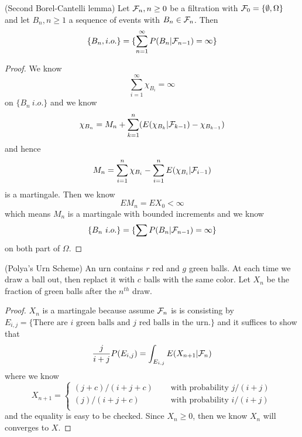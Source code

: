 \begin{theorem}
    (Second Borel-Cantelli lemma) Let $\mathcal{F}_n,n\geq 0$ be a filtration with $\mathcal{F}_0 = \{\emptyset,\Omega\}$ and let $B_n, n\geq 1$ a sequence of events with $B_n \in \mathcal{F}_n$. Then
    \[\{B_n,i.o.\} = \{\sum\limits_{n=1}^{\infty}P(B_n|\mathcal{F}_{n-1}) = \infty\}\]
\end{theorem}
\begin{proof}
    We know
    \[
    \sum\limits_{i=1}^{\infty} \chi_{B_i} = \infty
    \]
    on $\{B_n\ i.o.\}$
    and we know
    \[
    \chi_{B_n} = M_n + \sum\limits_{k=1}^n (E(\chi_{B_k}|\mathcal{F}_{k-1})-\chi_{B_{k-1}})
    \]
    and hence
    \[
    M_n = \sum\limits_{i=1}^n \chi_{B_i} - \sum\limits_{i=1}^{n}E(\chi_{B_i}|\mathcal{F}_{i-1})
    \]
    is a martingale. Then we know
    \[
    EM_n = EX_0 <\infty
    \]
    which means $M_n$ is a martingale with bounded increments and we know
    \[
    \{B_n\ i.o.\} = \{\sum P(B_n|\mathcal{F}_{n-1})=\infty\}
    \]
    on both part of $\Omega$.
\end{proof}

\begin{example}
    (Polya's Urn Scheme) An urn contains $r$ red and $g$ green balls. At each time we draw a ball out, then replact it with $c$ balls with the same color. Let $X_n$ be the fraction of green balls after the $n^{th}$ draw. 
\end{example}
\begin{proof}\par
    $X_n$ is a martingale because assume $\mathcal{F}_n$ is is consisting by $E_{i,j} = \{\text{There are }i\text{ green balls and }j\text{ red balls in the urn.}\}$ and it suffices to show that
    \[
    \dfrac{j}{i+j}P(E_{i,j})
    = \int_{E_{i,j}}E(X_{n+1}|\mathcal{F}_n)
    \]
    where we know
    \[
    X_{n+1}=\begin{cases}
        (j+c)/(i+j+c)&\quad\text{ with probability }j/(i+j)\\
        (j)/(i+j+c)&\quad\text{ with probability }i/(i+j)\\
    \end{cases}
    \]
    and the equality is easy to be checked. Since $X_n \geq 0$, then we know $X_n$ will converges to $X$.
\end{proof}

